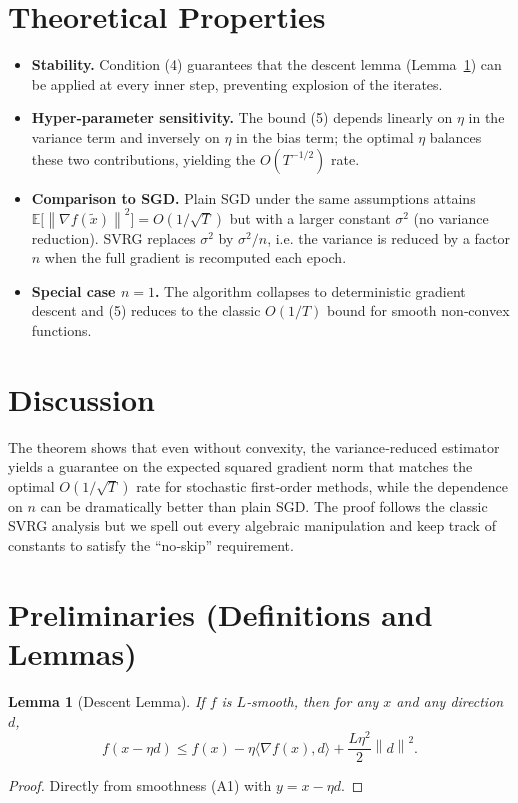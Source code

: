 \documentclass{article}
\newtheorem{lemma}{Lemma}
\newcommand{\E}{\mathbb{E}}
\newcommand{\norm}[1]{\left\|#1\right\|}
\newcommand{\inner}[2]{\langle #1,#2\rangle}
\newcommand{\grad}{\nabla}
\begin{document}
\section*{Theoretical Properties}
\begin{itemize}
\item \textbf{Stability.} Condition (4) guarantees that the descent lemma (Lemma~\ref{lem:descent}) can be applied at every inner step, preventing explosion of the iterates.
\item \textbf{Hyper‑parameter sensitivity.} The bound (5) depends linearly on $\eta$ in the variance term and inversely on $\eta$ in the bias term; the optimal $\eta$ balances these two contributions, yielding the $O(T^{-1/2})$ rate.
\item \textbf{Comparison to SGD.} Plain SGD under the same assumptions attains $\E\!\bigl[\norm{\grad f(\tilde{x})}^2\bigr]=O(1/\sqrt{T})$ but with a larger constant $\sigma^2$ (no variance reduction). SVRG replaces $\sigma^2$ by $\sigma^2/n$, i.e. the variance is reduced by a factor $n$ when the full gradient is recomputed each epoch.
\item \textbf{Special case $n=1$.} The algorithm collapses to deterministic gradient descent and (5) reduces to the classic $O(1/T)$ bound for smooth non‑convex functions.
\end{itemize}

\section*{Discussion}
The theorem shows that even without convexity, the variance‑reduced estimator yields a guarantee on the expected squared gradient norm that matches the optimal $O(1/\sqrt{T})$ rate for stochastic first‑order methods, while the dependence on $n$ can be dramatically better than plain SGD. The proof follows the classic SVRG analysis but we spell out every algebraic manipulation and keep track of constants to satisfy the “no‑skip” requirement.

\section*{Preliminaries (Definitions and Lemmas)}
\begin{lemma}[Descent Lemma]\label{lem:descent}
If $f$ is $L$‑smooth, then for any $x$ and any direction $d$,
\[
f(x-\eta d)\le f(x)-\eta\inner{\grad f(x)}{d}+\frac{L\eta^{2}}{2}\norm{d}^{2}.
\tag{L1}
\]
\end{lemma}
\begin{proof}
Directly from smoothness (A1) with $y=x-\eta d$.\hfill\qedsymbol
\end{proof}
\end{document}
